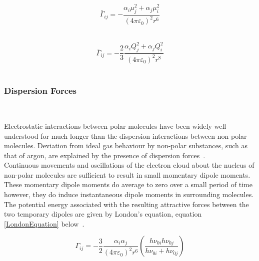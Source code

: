 \begin{equation}
\bar{\Gamma}_{ij} = -\frac{\alpha_{i}\mu_{j}^{2} + \alpha_{j}\mu_{i}^{2}}{\left(4\pi\varepsilon_{0}\right)^{2}r^{6}} \label{InducedDipole}
\end{equation}\

\begin{equation}
\bar{\Gamma}_{ij} = -\frac{2}{3}\frac{\alpha_{i}Q_{j}^{2} + \alpha_{j}Q_{i}^{2}}{\left(4\pi\varepsilon_{0}\right)^{2}r^{8}} \label{InducedQaud}
\end{equation}\

\subsubsection{Dispersion Forces}\

Electrostatic interactions between polar molecules have been widely well understood for much longer than the dispersion interactions between non-polar molecules. Deviation from ideal gas behaviour by non-polar substances, such as that of argon, are explained by the presence of dispersion forces~\cite{MolecularThermodynamicsOfFluidPhaseEquilibria}.\\

Continuous movements and oscillations of the electron cloud about the nucleus of non-polar molecules are sufficient to result in small momentary dipole moments. These momentary dipole moments do average to zero over a small period of time however, they do induce instantaneous dipole moments in surrounding molecules. The potential energy associated with the resulting attractive forces between the two temporary dipoles are given by London's equation, equation \ref{LondonEquation} below~\cite{MolecularThermodynamicsOfFluidPhaseEquilibria}.\ 

\begin{equation}
\Gamma_{ij} = -\frac{3}{2}\frac{\alpha_{i}\alpha_{j}}{\left(4\pi\varepsilon_{0}\right)^{2}r^{6}}\left(\frac{h\nu_{0i}h\nu_{0j}}{h\nu_{0i}+h\nu_{0j}}\right) \label{LondonEquation}
\end{equation}\


